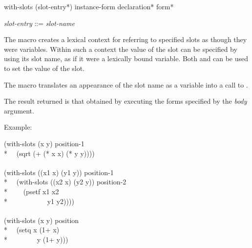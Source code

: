\begin{defmac}
with-slots ({slot-entry}*) instance-form {declaration}* {form}*

\begin{tabbing}
\emph{slot-entry\/} ::= \emph{slot-name\/} {\Mor} 
\end{tabbing}
The macro  creates a lexical context for referring to
specified slots as though they were variables.  Within such a context
the value of the slot can be specified by using its slot name, as if
it were a lexically bound variable.  Both  and 
can be used to set the value of the slot.

The macro  translates an appearance of the slot name as
a variable into a call to .

  



The result returned is that obtained by executing the forms specified
by the \emph{body\/} argument.

Example:

\begin{lisp}
(with-slots (x y) position-1 \\*
~~(sqrt (+ (* x x) (* y y)))) \\
\\
(with-slots ((x1 x) (y1 y)) position-1 \\*
~~(with-slots ((x2 x) (y2 y)) position-2 \\*
~~~~(psetf x1 x2 \\*
~~~~~~~~~~~y1 y2)))) \\
\\
(with-slots (x y) position \\*
~~(setq x (1+ x) \\*
~~~~~~~~y (1+ y)))
\end{lisp}



\end{defmac}
